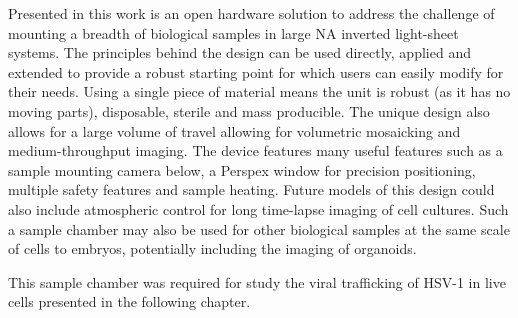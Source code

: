 Presented in this work is an open hardware solution to address the challenge of mounting a breadth of biological samples in large \gls{NA} inverted light-sheet systems.
The principles behind the design can be used directly, applied and extended to provide a robust starting point for which users can easily modify for their needs.
Using a single piece of  material means the unit is robust (as it has no moving parts), disposable, sterile and mass producible.
The unique design also allows for a large volume of travel allowing for volumetric mosaicking and medium-throughput imaging.
The device features many useful features such as a sample mounting camera below, a Perspex window for precision positioning, multiple safety features and sample heating.
Future models of this design could also include atmospheric control for long time-lapse imaging of cell cultures.
Such a sample chamber may also be used for other biological samples at the same scale of cells to embryos, potentially including the imaging of \gls{organoid}s.

This sample chamber was required for study the viral trafficking of \gls{HSV}-1 in live cells presented in the following chapter.
%


